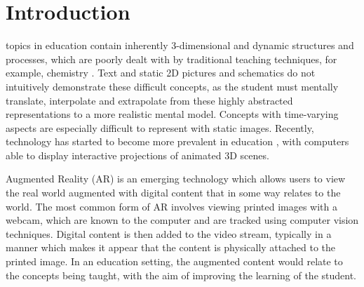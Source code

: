 \maketitle
\IEEEdisplaynotcompsoctitleabstractindextext
\IEEEpeerreviewmaketitle
\section{Introduction}

 topics in education contain inherently 3-dimensional and dynamic structures and processes, which are poorly dealt with by traditional teaching techniques, for example, chemistry \cite{Wu2004}. Text and static 2D pictures and schematics do not intuitively demonstrate these difficult concepts, as the student must mentally translate, interpolate and extrapolate from these highly abstracted representations to a more realistic mental model. Concepts with time-varying aspects are especially difficult to represent with static images. Recently, technology has started to become more prevalent in education \cite{Papa2009}\cite{Boster2006}, with computers able to display interactive projections of animated 3D scenes.

Augmented Reality (AR) is an emerging technology which allows users to view the real world augmented with digital content that in some way relates to the world. The most common form of AR involves viewing printed images with a webcam, which are known to the computer and are tracked using computer vision techniques. Digital content is then added to the video stream, typically in a manner which makes it appear that the content is physically attached to the printed image. In an education setting, the augmented content would relate to the concepts being taught, with the aim of improving the learning of the student.

